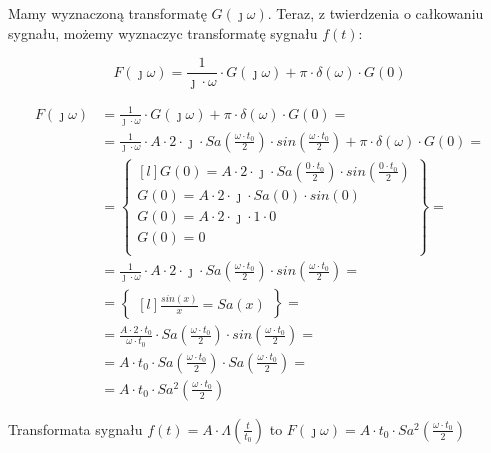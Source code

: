 \begin{task}
Mamy wyznaczoną transformatę $G(\jmath \omega)$. Teraz, z twierdzenia o całkowaniu sygnału, możemy wyznaczyc transformatę sygnału $f(t)$:

\begin{equation}
F(\jmath \omega) = \frac{1}{\jmath \cdot \omega} \cdot G(\jmath \omega) + \pi \cdot \delta(\omega) \cdot G(0)
\end{equation}

\begin{align*}
F(\jmath \omega)&= \frac{1}{\jmath \cdot \omega} \cdot G(\jmath \omega) + \pi \cdot \delta(\omega) \cdot G(0)=\\
&=\frac{1}{\jmath \cdot \omega} \cdot A \cdot 2 \cdot \jmath \cdot Sa\left(\frac{\omega \cdot t_{0}}{2}\right) \cdot sin\left(\frac{\omega \cdot t_{0}}{2}\right)+ \pi \cdot \delta(\omega) \cdot G(0)=\\
&=\begin{Bmatrix*}[l]
G(0)=A \cdot 2 \cdot \jmath \cdot Sa\left(\frac{0 \cdot t_{0}}{2}\right) \cdot sin\left(\frac{0 \cdot t_{0}}{2}\right)\\
G(0)=A \cdot 2 \cdot \jmath \cdot Sa(0) \cdot sin(0)\\
G(0)=A \cdot 2 \cdot \jmath \cdot 1 \cdot 0\\
G(0)=0\\
\end{Bmatrix*}=\\
&=\frac{1}{\jmath \cdot \omega} \cdot A \cdot 2 \cdot \jmath \cdot Sa\left(\frac{\omega \cdot t_{0}}{2}\right) \cdot sin\left(\frac{\omega \cdot t_{0}}{2}\right)=\\
&=\begin{Bmatrix*}[l]
\frac{sin(x)}{x}=Sa(x)
\end{Bmatrix*}=\\
&=\frac{A \cdot 2 \cdot t_{0}}{\omega \cdot t_{0}} \cdot Sa\left(\frac{\omega \cdot t_{0}}{2}\right) \cdot sin\left(\frac{\omega \cdot t_{0}}{2}\right)=\\
&=A \cdot t_{0} \cdot Sa\left(\frac{\omega \cdot t_{0}}{2}\right) \cdot Sa\left(\frac{\omega \cdot t_{0}}{2}\right)=\\
&= A \cdot t_{0} \cdot Sa^{2}(\frac{\omega \cdot t_{0}}{2})
\end{align*}


Transformata sygnału $f(t) = A \cdot \Lambda(\frac{t}{t_{0}})$ to $F(\jmath \omega)=A \cdot t_{0} \cdot Sa^{2}(\frac{\omega \cdot t_{0}}{2})$

\end{task}
